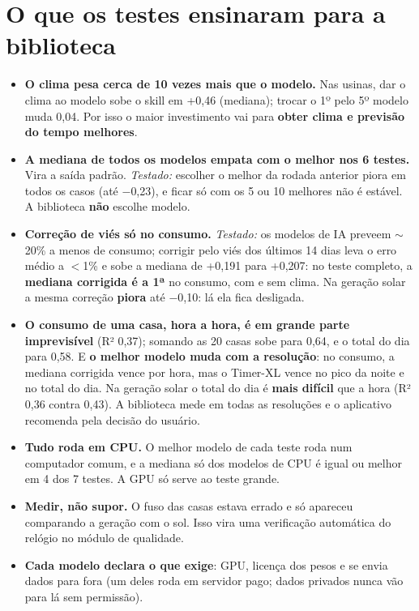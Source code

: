 \documentclass[10pt,a4paper]{article}
\begin{document}
\section{O que os testes ensinaram para a biblioteca}
\begin{itemize}
  \item \textbf{O clima pesa cerca de 10 vezes mais que o modelo.} Nas usinas, dar o clima ao modelo
        sobe o skill em +0,46 (mediana); trocar o 1º pelo 5º modelo muda 0,04. Por isso o maior
        investimento vai para \textbf{obter clima e previsão do tempo melhores}.
  \item \textbf{A mediana de todos os modelos empata com o melhor nos 6 testes.} Vira a saída padrão.
        \textit{Testado:} escolher o melhor da rodada anterior piora em todos os casos (até $-$0,23),
        e ficar só com os 5 ou 10 melhores não é estável. A biblioteca \textbf{não} escolhe modelo.
  \item \textbf{Correção de viés só no consumo.} \textit{Testado:} os modelos de IA preveem $\sim$20\% a
        menos de consumo; corrigir pelo viés dos últimos 14 dias leva o erro médio a $<$1\% e sobe a
        mediana de +0,191 para +0,207: no teste completo, a \textbf{mediana corrigida é a 1ª} no consumo,
        com e sem clima. Na geração solar a mesma correção \textbf{piora} até $-$0,10: lá ela fica desligada.
  \item \textbf{O consumo de uma casa, hora a hora, é em grande parte imprevisível} (R² 0,37); somando as
        20 casas sobe para 0,64, e o total do dia para 0,58. E \textbf{o melhor modelo muda com a
        resolução}: no consumo, a mediana corrigida vence por hora, mas o Timer-XL vence no pico da noite e no
        total do dia. Na geração solar o total do dia é \textbf{mais difícil} que a hora (R² 0,36 contra 0,43).
        A biblioteca mede em todas as resoluções e o aplicativo recomenda pela decisão do usuário.
  \item \textbf{Tudo roda em CPU.} O melhor modelo de cada teste roda num computador comum, e a mediana só
        dos modelos de CPU é igual ou melhor em 4 dos 7 testes. A GPU só serve ao teste grande.
  \item \textbf{Medir, não supor.} O fuso das casas estava errado e só apareceu comparando a geração com o
        sol. Isso vira uma verificação automática do relógio no módulo de qualidade.
  \item \textbf{Cada modelo declara o que exige}: GPU, licença dos pesos e se envia dados para fora (um
        deles roda em servidor pago; dados privados nunca vão para lá sem permissão).
\end{itemize}
\end{document}
